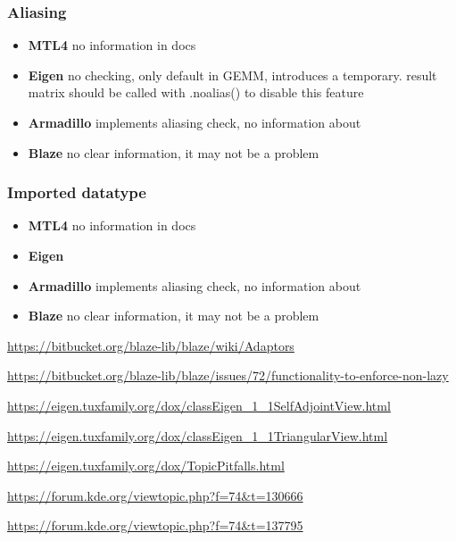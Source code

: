 \documentclass{article}
\begin{document}
\subsubsection{Aliasing}
\begin{itemize}
\item \textbf{MTL4} no information in docs \\
\item \textbf{Eigen} no checking, only default in GEMM, introduces a temporary. result matrix should be called with .noalias() to disable this feature\\ 
\item \textbf{Armadillo} implements aliasing check, no information about  \\
\item \textbf{Blaze} no clear information, it may not be a problem \\
\end{itemize}

\subsubsection{Imported datatype}
\begin{itemize}
\item \textbf{MTL4} no information in docs \\
\item \textbf{Eigen} \\ 
\item \textbf{Armadillo} implements aliasing check, no information about  \\
\item \textbf{Blaze} no clear information, it may not be a problem \\
\end{itemize}


\begin{thebibliography}{9}

\url{https://bitbucket.org/blaze-lib/blaze/wiki/Adaptors}

\url{https://bitbucket.org/blaze-lib/blaze/issues/72/functionality-to-enforce-non-lazy}

\url{https://eigen.tuxfamily.org/dox/classEigen_1_1SelfAdjointView.html}

\url{https://eigen.tuxfamily.org/dox/classEigen_1_1TriangularView.html}

\url{https://eigen.tuxfamily.org/dox/TopicPitfalls.html}

\url{https://forum.kde.org/viewtopic.php?f=74&t=130666}

\url{https://forum.kde.org/viewtopic.php?f=74&t=137795}

\end{thebibliography}
\end{document}
